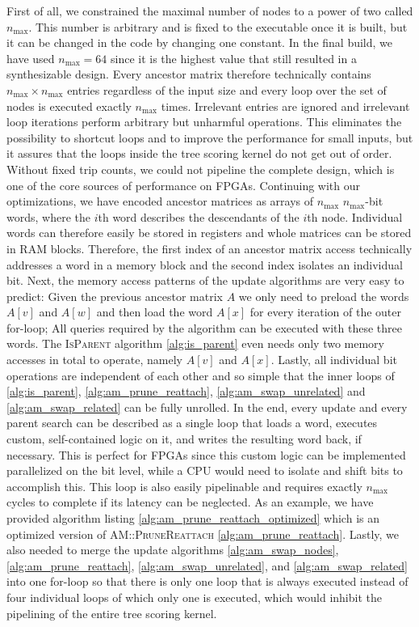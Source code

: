 First of all, we constrained the maximal number of nodes to a power of two called $n_\mathrm{max}$. This number is arbitrary and is fixed to the executable once it is built, but it can be changed in the code by changing one constant. In the final build, we have used $n_\mathrm{max} = 64$ since it is the highest value that still resulted in a synthesizable design. Every ancestor matrix therefore technically contains $n_\mathrm{max} \times n_\mathrm{max}$ entries regardless of the input size and every loop over the set of nodes is executed exactly $n_\mathrm{max}$ times. Irrelevant entries are ignored and irrelevant loop iterations perform arbitrary but unharmful operations. This eliminates the possibility to shortcut loops and to improve the performance for small inputs, but it assures that the loops inside the tree scoring kernel do not get out of order. Without fixed trip counts, we could not pipeline the complete design, which is one of the core sources of performance on \acp{FPGA}. Continuing with our optimizations, we have encoded ancestor matrices as arrays of $n_\mathrm{max}$ $n_\mathrm{max}$-bit words, where the $i$th word describes the descendants of the $i$th node. Individual words can therefore easily be stored in registers and whole matrices can be stored in \ac{RAM} blocks. Therefore, the first index of an ancestor matrix access technically addresses a word in a memory block and the second index isolates an individual bit. Next, the memory access patterns of the update algorithms are very easy to predict: Given the previous ancestor matrix $A$ we only need to preload the words $A[v]$ and $A[w]$ and then load the word $A[x]$ for every iteration of the outer for-loop; All queries required by the algorithm can be executed with these three words. The \textsc{IsParent} algorithm \ref{alg:is_parent} even needs only two memory accesses in total to operate, namely $A[v]$ and $A[x]$. Lastly, all individual bit operations are independent of each other and so simple that the inner loops of \ref{alg:is_parent}, \ref{alg:am_prune_reattach}, \ref{alg:am_swap_unrelated} and \ref{alg:am_swap_related} can be fully unrolled. In the end, every update and every parent search can be described as a single loop that loads a word, executes custom, self-contained logic on it, and writes the resulting word back, if necessary. This is perfect for \acp{FPGA} since this custom logic can be implemented parallelized on the bit level, while a \ac{CPU} would need to isolate and shift bits to accomplish this. This loop is also easily pipelinable and requires exactly $n_\mathrm{max}$ cycles to complete if its latency can be neglected. As an example, we have provided algorithm listing \ref{alg:am_prune_reattach_optimized} which is an optimized version of \textsc{AM::PruneReattach} \ref{alg:am_prune_reattach}. Lastly, we also needed to merge the update algorithms \ref{alg:am_swap_nodes}, \ref{alg:am_prune_reattach}, \ref{alg:am_swap_unrelated}, and \ref{alg:am_swap_related} into one for-loop so that there is only one loop that is always executed instead of four individual loops of which only one is executed, which would inhibit the pipelining of the entire tree scoring kernel.

